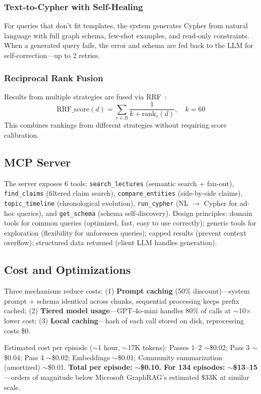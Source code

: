 \subsubsection{Text-to-Cypher with Self-Healing}

For queries that don't fit templates, the system generates Cypher from natural language with full graph schema, few-shot examples, and read-only constraints. When a generated query fails, the error and schema are fed back to the LLM for self-correction---up to 2 retries.

\subsubsection{Reciprocal Rank Fusion}

Results from multiple strategies are fused via RRF~\cite{cormack2009rrf}:
\begin{equation}
    \text{RRF\_score}(d) = \sum_{r \in R} \frac{1}{k + \text{rank}_r(d)}, \quad k = 60
\end{equation}
This combines rankings from different strategies without requiring score calibration.

\subsection{MCP Server}

The server exposes 6 tools: \texttt{search\_lectures} (semantic search + fan-out), \texttt{find\_claims} (filtered claim search), \texttt{compare\_entities} (side-by-side claims), \texttt{topic\_timeline} (chronological evolution), \texttt{run\_cypher} (NL $\rightarrow$ Cypher for ad-hoc queries), and \texttt{get\_schema} (schema self-discovery). Design principles: domain tools for common queries (optimized, fast, easy to use correctly); generic tools for exploration (flexibility for unforeseen queries); capped results (prevent context overflow); structured data returned (client LLM handles generation).

\subsection{Cost and Optimizations}

Three mechanisms reduce costs: (1) \textbf{Prompt caching} (50\% discount)---system prompt + schema identical across chunks, sequential processing keeps prefix cached; (2) \textbf{Tiered model usage}---GPT-4o-mini handles 80\% of calls at $\sim$10$\times$ lower cost; (3) \textbf{Local caching}---hash of each call stored on disk, reprocessing costs \$0.

Estimated cost per episode ($\sim$1 hour, $\sim$17K tokens): Passes 1--2 $\sim$\$0.02; Pass 3 $\sim$\$0.04; Pass 4 $\sim$\$0.02; Embeddings $\sim$\$0.01; Community summarization (amortized) $\sim$\$0.01. \textbf{Total per episode: $\sim$\$0.10. For 134 episodes: $\sim$\$13--15}---orders of magnitude below Microsoft GraphRAG's estimated \$33K at similar scale.
